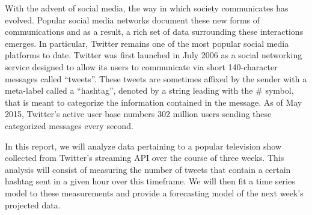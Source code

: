 With the advent of social media, the way in which society communicates has evolved. Popular
social media networks document these new forms of communications and as a result, a rich
set of data surrounding these interactions emerges. In particular, Twitter
remains one of the most popular social media platforms
to date. Twitter was first launched in July 2006 as a social networking service
designed to allow its users to communicate via short 140-character messages
called ``tweets''. These tweets are sometimes affixed by the sender with a meta-label
called a ``hashtag'', denoted by a string leading with the \# symbol, that is
meant to categorize the information contained in the
message. As of May 2015, Twitter's active user base numbers 302 million users sending
these categorized messages every second.

In this report, we will analyze data pertaining to a popular television show
collected from Twitter's streaming API over the course of three weeks. This
analysis will consist of measuring the number of tweets that contain a certain
hashtag sent in a given hour over this timeframe. We will then fit a time
series model to these measurements and provide a forecasting model of the next
week's projected data.